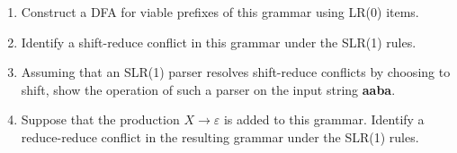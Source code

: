 \documentclass[10pt]{article}
\begin{document}
\begin{enumerate}
\begin{enumerate}

\item Construct a DFA for viable prefixes of this grammar using LR(0)
items.
          \[
            \]
\item Identify a shift-reduce conflict in this grammar under the
SLR(1) rules.
          \[
            \]
\item Assuming that an SLR(1) parser resolves shift-reduce conflicts
by choosing to shift, show the operation of such a parser on the input
string \textbf{aaba}.
          \[
            \]
\item Suppose that the production $X \rightarrow \varepsilon$ is added
to this grammar.  Identify a reduce-reduce conflict in the resulting
grammar under the SLR(1) rules.
          \[
            \]
\end{enumerate}
\end{enumerate}
\end{document}
